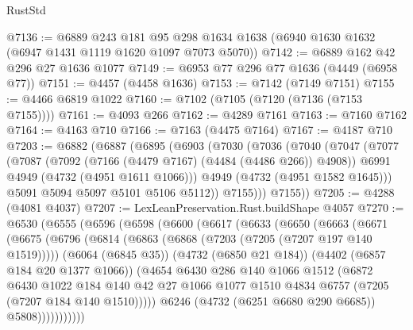 \begin{lexlean}{RustStd}
\begin{coremodule}
{\begin{coremodule}
{{{{{{{{{{{{{{@7136 := @6889
    @243
    @181
    @95
    @298
    @1634
    @1638
    (@6940 @1630 @1632 (@6947 @1431 @1119 @1620 @1097 @7073 @5070))
@7142 := @6889 @162 @42 @296 @27 @1636 @1077
@7149 := @6953 @77 @296 @77 @1636 (@4449 (@6958 @77))
@7151 := @4457 (@4458 @1636)
@7153 := @7142 (@7149 @7151)
@7155 := @4466 @6819 @1022
@7160 := @7102 (@7105 (@7120 (@7136 (@7153 @7155))))
@7161 := @4093 @266
@7162 := @4289 @7161
@7163 := @7160 @7162
@7164 := @4163 @710
@7166 := @7163 (@4475 @7164)
@7167 := @4187 @710
@7203 := @6882
    (@6887
      (@6895
        (@6903
          (@7030
            (@7036
              (@7040
                (@7047
                  (@7077
                    (@7087
                      (@7092 (@7166 (@4479 @7167) (@4484 (@4486 @266)) @4908))
                      @6991
                      @4949
                      (@4732 (@4951 @1611 @1066)))
                    @4949
                    (@4732 (@4951 @1582 @1645)))
                  @5091
                  @5094
                  @5097
                  @5101
                  @5106
                  @5112))
              @7155)))
        @7155))
@7205 := @4288 (@4081 @4037)
@7207 := LexLeanPreservation.Rust.buildShape @4057
@7270 := @6530
    (@6555
      (@6596
        (@6598
          (@6600
            (@6617
              (@6633
                (@6650
                  (@6663
                    (@6671
                      (@6675
                        (@6796
                          (@6814
                            (@6863 (@6868 (@7203 (@7205 (@7207 @197 @140 @1519)))))
                            (@6064 (@6845 @35))
                            (@4732 (@6850 @21 @184))
                            (@4402 (@6857 @184 @20 @1377 @1066))
                            (@4654
                              @6430
                              @286
                              @140
                              @1066
                              @1512
                              (@6872
                                @6430
                                @1022
                                @184
                                @140
                                @42
                                @27
                                @1066
                                @1077
                                @1510
                                @4834
                                @6757
                                (@7205 (@7207 @184 @140 @1510)))))
                          @6246
                          (@4732 (@6251 @6680 @290 @6685))
                          @5808)))))))))))
}}}}}}}}}}}}}}
\end{coremodule}}
\end{coremodule}
\end{lexlean}
